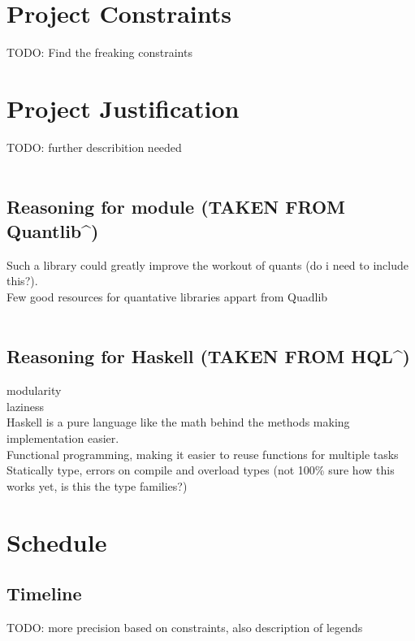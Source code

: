 \section{Project Constraints}

TODO: Find the freaking constraints

\section{Project Justification}

TODO: further describition needed\\
\\
\subsection{Reasoning for module (TAKEN FROM Quantlib^\cite{QULI})}
Such a library could greatly improve the workout of quants (do i need to include this?).\\
Few good resources for quantative libraries appart from Quadlib\\
\\
\subsection{Reasoning for Haskell (TAKEN FROM HQL^\cite{HQL})}
modularity\\
laziness\\
Haskell is a pure language like the math behind the methods making implementation easier.\\
Functional programming, making it easier to reuse functions for multiple tasks\\
Statically type, errors on compile and overload types (not 100\% sure how this works yet, is this the type families?)\\


\section{Schedule}

\subsection{Timeline}

TODO: more precision based on constraints, also description of legends

